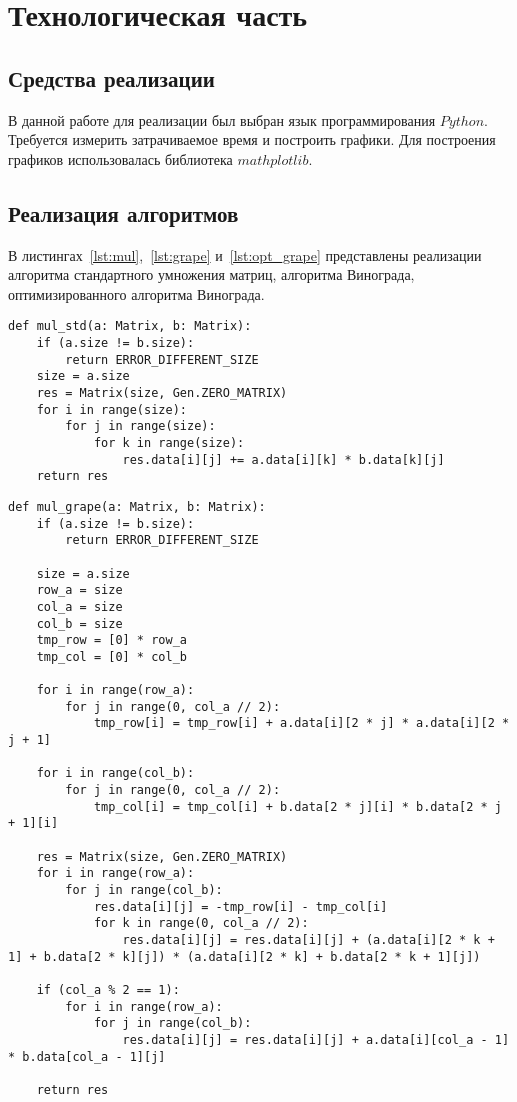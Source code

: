 \chapter{Технологическая часть}

\section{Средства реализации}

В данной работе для реализации был выбран язык программирования $Python$. Требуется измерить затрачиваемое время и построить графики. Для построения графиков использовалась библиотека $mathplotlib$.

\section{Реализация алгоритмов}

В листингах~\ref{lst:mul},~\ref{lst:grape} и~\ref{lst:opt_grape} представлены реализации алгоритма стандартного умножения матриц, алгоритма Винограда, оптимизированного алгоритма Винограда.
\begin{center}
    \captionsetup{justification=raggedright,singlelinecheck=off}
    \begin{lstlisting}[label=lst:mul,caption=Стандартный алгоритм умножения матриц]
def mul_std(a: Matrix, b: Matrix):
	if (a.size != b.size):
		return ERROR_DIFFERENT_SIZE
	size = a.size
	res = Matrix(size, Gen.ZERO_MATRIX)
	for i in range(size):
		for j in range(size):
			for k in range(size):
				res.data[i][j] += a.data[i][k] * b.data[k][j]
	return res
\end{lstlisting}
\end{center}

\clearpage

\begin{center}
    \captionsetup{justification=raggedright,singlelinecheck=off}
    \begin{lstlisting}[label=lst:grape,caption=Алгоритм Винограда]
def mul_grape(a: Matrix, b: Matrix):
	if (a.size != b.size):
		return ERROR_DIFFERENT_SIZE
	
	size = a.size
	row_a = size
	col_a = size
	col_b = size
	tmp_row = [0] * row_a
	tmp_col = [0] * col_b
	
	for i in range(row_a):
		for j in range(0, col_a // 2):
			tmp_row[i] = tmp_row[i] + a.data[i][2 * j] * a.data[i][2 * j + 1]

	for i in range(col_b):
		for j in range(0, col_a // 2):
			tmp_col[i] = tmp_col[i] + b.data[2 * j][i] * b.data[2 * j + 1][i] 

	res = Matrix(size, Gen.ZERO_MATRIX)
	for i in range(row_a):
		for j in range(col_b):
			res.data[i][j] = -tmp_row[i] - tmp_col[i]   
			for k in range(0, col_a // 2):
				res.data[i][j] = res.data[i][j] + (a.data[i][2 * k + 1] + b.data[2 * k][j]) * (a.data[i][2 * k] + b.data[2 * k + 1][j])

	if (col_a % 2 == 1):
		for i in range(row_a):
			for j in range(col_b):
				res.data[i][j] = res.data[i][j] + a.data[i][col_a - 1] * b.data[col_a - 1][j]

	return res
\end{lstlisting}
\end{center}

